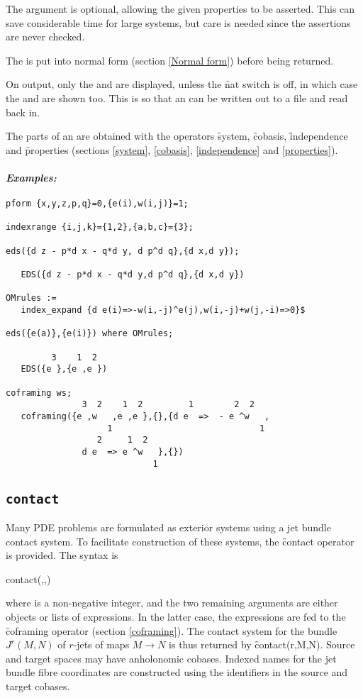 The  argument is optional, allowing the given properties
to be asserted. This can save considerable time for large systems, but care
is needed since the assertions are never checked.

The  is put into normal form (section \ref{Normal form}) before
being returned.

On output, only the  and  are
displayed, unless the \f{nat} switch is off, in which case the
 and  are shown too. This is so that an
 can be written out to a file and read back in. 

The parts of an  are obtained with the operators \f{system},
\f{cobasis}, \f{independence} and \f{properties} (sections \ref{system},
\ref{cobasis}, \ref{independence} and \ref{properties}).

\paragraph{\it Examples:}
\begin{verbatim}
pform {x,y,z,p,q}=0,{e(i),w(i,j)}=1;

indexrange {i,j,k}={1,2},{a,b,c}={3};

eds({d z - p*d x - q*d y, d p^d q},{d x,d y});

   EDS({d z - p*d x - q*d y,d p^d q},{d x,d y}) 

OMrules := 
   index_expand {d e(i)=>-w(i,-j)^e(j),w(i,-j)+w(j,-i)=>0}$

eds({e(a)},{e(i)}) where OMrules;

         3    1  2
   EDS({e },{e ,e })

coframing ws;
               3  2    1  2         1        2  2 
   coframing({e ,w   ,e ,e },{},{d e  =>  - e ^w   ,
                    1                             1 
                  2     1  2 
               d e  => e ^w   },{})
                             1 
\end{verbatim}

\subsection{\tt contact}
\label{contact}

Many PDE problems are formulated as exterior systems using a jet bundle
contact system. To facilitate construction of these systems, the
\f{contact} operator is provided. The syntax is
\begin{syntax}
	contact(,,)
\end{syntax}
where  is a non-negative integer, and the two remaining
arguments are either  objects or lists of 
expressions. In the latter case, the expressions are fed to the
\f{coframing} operator (section \ref{coframing}). The contact system for the
bundle $J^r(M,N)$ of $r$-jets of maps $M\to N$ is thus returned by
\f{contact(r,M,N)}. Source and target spaces may have anholonomic
cobases. Indexed names for the jet bundle fibre coordinates are constructed
using the identifiers in the source and target cobases.

